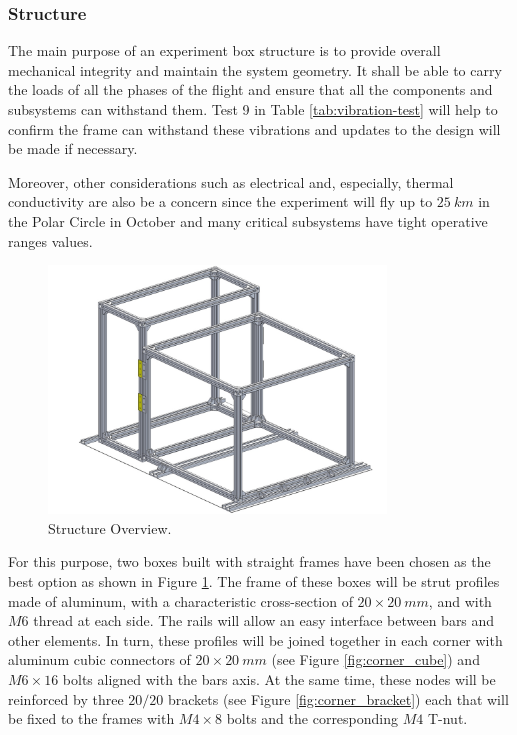 \documentclass[a4paper,12pt,twoside]{article}
\begin{document}
\pagebreak
\subsubsection{Structure}
\label{sec:4.4.1}

The main purpose of an experiment box structure is to provide overall mechanical integrity and maintain the system geometry. It shall be able to carry the loads of all the phases of the flight and ensure that all the components and subsystems can withstand them. Test 9 in Table \ref{tab:vibration-test} will help to confirm the frame can withstand these vibrations and updates to the design will be made if necessary.

Moreover, other considerations such as electrical and, especially, thermal conductivity are also be a concern since the experiment will fly up to $25\ km$ in the Polar Circle in October and many critical subsystems have tight operative ranges values.

 \begin{figure}[H]
     \centering
     \includegraphics[width=0.8\textwidth]{4-experiment-design/img/Mechanical/structure_pic.jpg}
     \caption{Structure Overview.}
     \label{fig:structure}
\end{figure}

For this purpose, two boxes built with straight frames have been chosen as the best option as shown in Figure \ref{fig:structure}. The frame of these boxes will be strut profiles made of aluminum, with a characteristic cross-section of $20\times20\ mm$, and with $M6$ thread at each side. The rails will allow an easy interface between bars and other elements. In turn, these profiles will be joined together in each corner with aluminum cubic connectors of $20\times20\ mm$ (see Figure \ref{fig:corner_cube}) and $M6\times16$ bolts aligned with the bars axis. At the same time, these nodes will be reinforced by three $20/20$ brackets (see Figure \ref{fig:corner_bracket}) each that will be fixed to the frames with $M4\times8$ bolts and the corresponding $M4$ T-nut.
\end{document}
